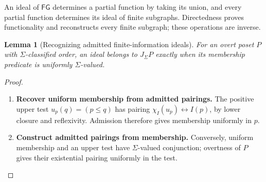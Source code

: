 \documentclass[11pt,a4paper]{article}
\numberwithin{algorithm}{section}
\numberwithin{equation}{section}
\newtheorem{lemma}[lemma]{Lemma}
\theoremstyle{definition}
\theoremstyle{remark}
\theoremstyle{plain}
\newcommand{\J}{J_{\Sigma}}
\theoremstyle{definition}
\theoremstyle{plain}
\begin{document}
 An ideal of $\mathsf{FG}$ determines a partial function by
taking its union, and every partial function determines its ideal
of finite subgraphs. Directedness proves functionality and
reconstructs every finite subgraph; these operations are inverse.

\begin{lemma}[Recognizing admitted finite-information ideals]
\label{lem:standalone-searchable}
For an overt poset $P$ with $\Sigma$-classified order, an ideal
belongs to $\J P$ exactly when its membership predicate is
uniformly $\Sigma$-valued.
\end{lemma}
\begin{proof}\leavevmode
\begin{enumerate}[leftmargin=*,align=left]
\item \textbf{Recover uniform membership from admitted pairings.}
The positive upper test $u_p(q)=(p\le q)$ has pairing
$\chi_I(u_p)\leftrightarrow I(p)$, by lower closure and reflexivity.
Admission therefore gives membership uniformly in $p$.

\item \textbf{Construct admitted pairings from membership.}
Conversely, uniform membership and an upper test have
$\Sigma$-valued conjunction; overtness of $P$ gives their
existential pairing uniformly in the test.
\end{enumerate}
\end{proof}
\end{document}

